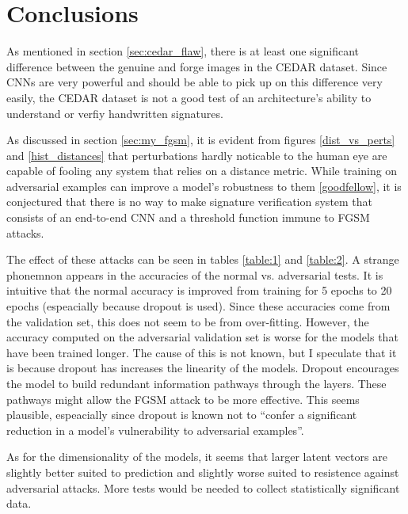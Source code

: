 \section{Conclusions}\label{sec:conclusion}

As mentioned in section \ref{sec:cedar_flaw}, there is at least one significant difference between the genuine and forge images in the CEDAR dataset.
Since CNNs are very powerful and should be able to pick up on this difference very easily, the CEDAR dataset is not a good test of an architecture's ability to understand or verfiy handwritten signatures.

As discussed in section \ref{sec:my_fgsm}, it is evident from figures \ref{dist_vs_perts} and \ref{hist_distances} that perturbations hardly noticable to the human eye are capable of fooling any system that relies on a distance metric.
While training on adversarial examples can improve a model's robustness to them \ref{goodfellow}, it is conjectured that there is no way to make signature verification system that consists of an end-to-end CNN and a threshold function immune to FGSM attacks.

The effect of these attacks can be seen in tables \ref{table:1} and \ref{table:2}.
A strange phonemnon appears in the accuracies of the normal vs. adversarial tests.
It is intuitive that the normal accuracy is improved from training for 5 epochs to 20 epochs (espeacially because dropout is used).
Since these accuracies come from the validation set, this does not seem to be from over-fitting.
However, the accuracy computed on the adversarial validation set is worse for the models that have been trained longer.
The cause of this is not known, but I speculate that it is because dropout has increases the linearity of the models.
Dropout encourages the model to build redundant information pathways through the layers.
These pathways might allow the FGSM attack to be more effective.
This seems plausible, espeacially since dropout is known not to ``confer a significant reduction in a model's vulnerability to adversarial examples''\cite{goodfellow}.

As for the dimensionality of the models, it seems that larger latent vectors are slightly better suited to prediction and slightly worse suited to resistence against adversarial attacks.
More tests would be needed to collect statistically significant data.

